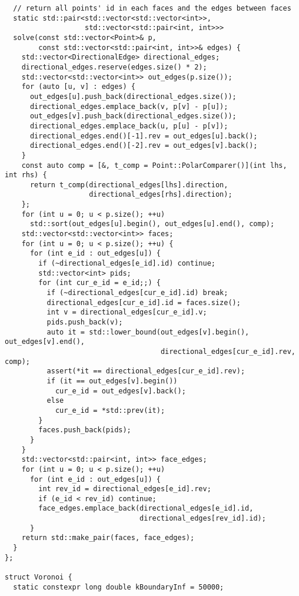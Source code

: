 \documentclass[6pt]{article}
\begin{document}
\begin{multicols}{2}
\begin{lstlisting}
  // return all points' id in each faces and the edges between faces
  static std::pair<std::vector<std::vector<int>>,
                   std::vector<std::pair<int, int>>>
  solve(const std::vector<Point>& p,
        const std::vector<std::pair<int, int>>& edges) {
    std::vector<DirectionalEdge> directional_edges;
    directional_edges.reserve(edges.size() * 2);
    std::vector<std::vector<int>> out_edges(p.size());
    for (auto [u, v] : edges) {
      out_edges[u].push_back(directional_edges.size());
      directional_edges.emplace_back(v, p[v] - p[u]);
      out_edges[v].push_back(directional_edges.size());
      directional_edges.emplace_back(u, p[u] - p[v]);
      directional_edges.end()[-1].rev = out_edges[u].back();
      directional_edges.end()[-2].rev = out_edges[v].back();
    }
    const auto comp = [&, t_comp = Point::PolarComparer()](int lhs, int rhs) {
      return t_comp(directional_edges[lhs].direction,
                    directional_edges[rhs].direction);
    };
    for (int u = 0; u < p.size(); ++u)
      std::sort(out_edges[u].begin(), out_edges[u].end(), comp);
    std::vector<std::vector<int>> faces;
    for (int u = 0; u < p.size(); ++u) {
      for (int e_id : out_edges[u]) {
        if (~directional_edges[e_id].id) continue;
        std::vector<int> pids;
        for (int cur_e_id = e_id;;) {
          if (~directional_edges[cur_e_id].id) break;
          directional_edges[cur_e_id].id = faces.size();
          int v = directional_edges[cur_e_id].v;
          pids.push_back(v);
          auto it = std::lower_bound(out_edges[v].begin(), out_edges[v].end(),
                                     directional_edges[cur_e_id].rev, comp);
          assert(*it == directional_edges[cur_e_id].rev);
          if (it == out_edges[v].begin())
            cur_e_id = out_edges[v].back();
          else
            cur_e_id = *std::prev(it);
        }
        faces.push_back(pids);
      }
    }
    std::vector<std::pair<int, int>> face_edges;
    for (int u = 0; u < p.size(); ++u)
      for (int e_id : out_edges[u]) {
        int rev_id = directional_edges[e_id].rev;
        if (e_id < rev_id) continue;
        face_edges.emplace_back(directional_edges[e_id].id,
                                directional_edges[rev_id].id);
      }
    return std::make_pair(faces, face_edges);
  }
};

struct Voronoi {
  static constexpr long double kBoundaryInf = 50000;


\end{lstlisting}
\end{multicols}
\end{document}
